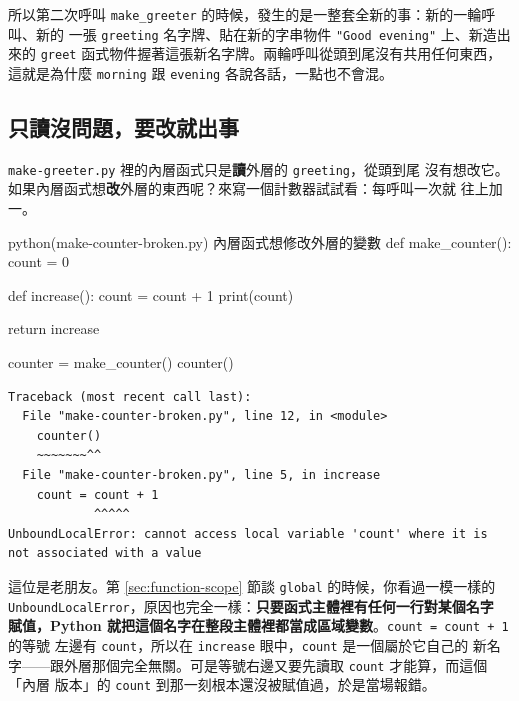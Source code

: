 所以第二次呼叫 \texttt{make\_greeter} 的時候，發生的是一整套全新的事：新的一輪呼叫、新的
一張 \texttt{greeting} 名字牌、貼在新的字串物件 \texttt{"Good evening"} 上、新造出來的
\texttt{greet} 函式物件握著這張新名字牌。兩輪呼叫從頭到尾沒有共用任何東西，這就是為什麼
\texttt{morning} 跟 \texttt{evening} 各說各話，一點也不會混。


\subsection*{只讀沒問題，要改就出事}

\texttt{make-greeter.py} 裡的內層函式只是\textbf{讀}外層的 \texttt{greeting}，從頭到尾
沒有想改它。如果內層函式想\textbf{改}外層的東西呢？來寫一個計數器試試看：每呼叫一次就
往上加一。

\begin{example}{python}{(make-counter-broken.py) 內層函式想修改外層的變數}
def make_counter():
    count = 0

    def increase():
        count = count + 1
        print(count)

    return increase


counter = make_counter()
counter()
\end{example}

\begin{verbatim}
Traceback (most recent call last):
  File "make-counter-broken.py", line 12, in <module>
    counter()
    ~~~~~~~^^
  File "make-counter-broken.py", line 5, in increase
    count = count + 1
            ^^^^^
UnboundLocalError: cannot access local variable 'count' where it is not associated with a value
\end{verbatim}

這位是老朋友。第 \ref{sec:function-scope} 節談 \texttt{global} 的時候，你看過一模一樣的
\texttt{UnboundLocalError}，原因也完全一樣：\textbf{只要函式主體裡有任何一行對某個名字
賦值，Python 就把這個名字在整段主體裡都當成區域變數}。\texttt{count = count + 1} 的等號
左邊有 \texttt{count}，所以在 \texttt{increase} 眼中，\texttt{count} 是一個屬於它自己的
新名字——跟外層那個完全無關。可是等號右邊又要先讀取 \texttt{count} 才能算，而這個「內層
版本」的 \texttt{count} 到那一刻根本還沒被賦值過，於是當場報錯。

